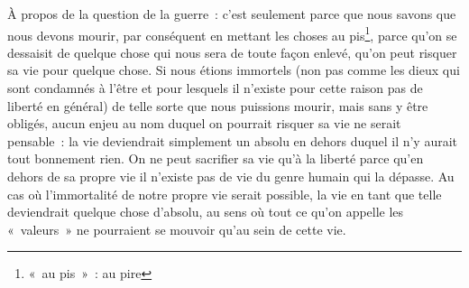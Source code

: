 {

\bigskip

À propos de la question de la guerre~: c'est seulement parce que nous
savons que nous devons mourir, par conséquent en mettant les choses
au pis\footnote{«~au pis~»~: au pire}, parce qu'on se dessaisit de quelque chose qui nous sera de
toute façon enlevé, qu'on peut risquer sa vie pour quelque chose. Si
nous étions immortels (non pas comme les dieux qui sont condamnés à
l'être et pour lesquels il n'existe pour cette raison pas de liberté
en général) de telle sorte que nous puissions mourir, mais sans y
être obligés, aucun enjeu au nom duquel on pourrait risquer sa vie ne
serait pensable~: la vie deviendrait simplement un absolu en dehors
duquel il n'y aurait tout bonnement rien. On ne peut sacrifier sa vie
qu'à la liberté parce qu'en dehors de sa propre vie il n'existe pas
de vie du genre humain qui la dépasse. Au cas où l'immortalité de
notre propre vie serait possible, la vie en tant que telle
deviendrait quelque chose d'absolu, au sens où tout ce qu'on appelle
les «~valeurs~» ne pourraient se mouvoir qu'au sein de cette vie.

}
